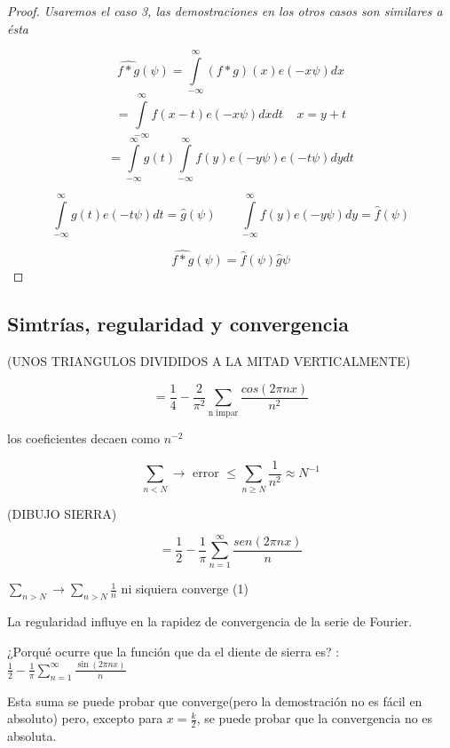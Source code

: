 \begin{proof}
	\textit{Usaremos el caso 3, las demostraciones en los otros casos son similares a ésta}

$$ \hat{f*g}(\psi) = \int\limits^{\infty}_{-\infty} (f*g)(x) e(-x\psi)dx $$
$$ = \int\limits^{\infty}_{-\infty} f(x - t) e (-x \psi) dx dt \;\;\;\; x = y + t$$
$$ = \int\limits^{\infty}_{-\infty} g(t) \int\limits^{\infty}_{-\infty} f(y) e (-y \psi) e(-t\psi)dy dt$$

$$ \int\limits^{\infty}_{-\infty} g(t) e(-t\psi) dt = \hat{g}(\psi) \;\;\;\;\;\;\; \int\limits^{\infty}_{-\infty} f(y) e (-y \psi) dy = \hat{f}(\psi) $$

$$\hat{f*g} (\psi) = \hat{f}(\psi) \hat{g}\psi $$

\end{proof}



\subsection{Simtrías, regularidad y convergencia}


(UNOS TRIANGULOS DIVIDIDOS A LA MITAD VERTICALMENTE)

$$ = \frac{1}{4} - \frac{2}{\pi^2} \sum_{\text{n impar}} \frac{cos(2 \pi n x)}{n^2}$$

los coeficientes decaen como $n^{-2}$

$$ \sum_{n < N} \rightarrow \text{ error } \leq \sum_{n \geq N} \frac{1}{n^2}  ≈ N^{-1} $$



(DIBUJO SIERRA)  

$$ = \frac{1}{2} - \frac{1}{\pi} \sum^{\infty}_{n = 1} \frac{sen(2 \pi n x)}{n}$$

$ \sum_{n > N} \rightarrow \sum_{n > N} \frac{1}{n}$ ni siquiera converge (1)

La regularidad influye en la rapidez de convergencia de la serie de Fourier.




¿Porqué ocurre que la función que da el diente de sierra es? : $\frac{1}{2} - \frac{1}{\pi} \sum_{n=1}^{\infty} \frac{\sin(2\pi nx)}{n}$
	
Esta suma se puede probar que converge(pero la demostración no es fácil en absoluto) pero, excepto para $x = \frac{k}{2}$, se puede probar que la convergencia no es absoluta.

